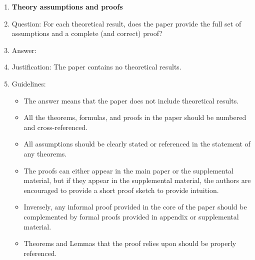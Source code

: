 \documentclass{article}
\begin{document}
\begin{enumerate}
\begin{itemize}
        \item While the authors might fear that complete honesty about limitations might be used by reviewers as grounds for rejection, a worse outcome might be that reviewers discover limitations that aren't acknowledged in the paper. The authors should use their best judgment and recognize that individual actions in favor of transparency play an important role in developing norms that preserve the integrity of the community. Reviewers will be specifically instructed to not penalize honesty concerning limitations.
    \end{itemize}

\item {\bf Theory assumptions and proofs}
    \item[] Question: For each theoretical result, does the paper provide the full set of assumptions and a complete (and correct) proof?
    \item[] Answer: \answerNA{}
    \item[] Justification: The paper contains no theoretical results.
    \item[] Guidelines:
    \begin{itemize}
        \item The answer \answerNA{} means that the paper does not include theoretical results. 
        \item All the theorems, formulas, and proofs in the paper should be numbered and cross-referenced.
        \item All assumptions should be clearly stated or referenced in the statement of any theorems.
        \item The proofs can either appear in the main paper or the supplemental material, but if they appear in the supplemental material, the authors are encouraged to provide a short proof sketch to provide intuition. 
        \item Inversely, any informal proof provided in the core of the paper should be complemented by formal proofs provided in appendix or supplemental material.
        \item Theorems and Lemmas that the proof relies upon should be properly referenced. 
    \end{itemize}


\end{enumerate}
\end{document}
